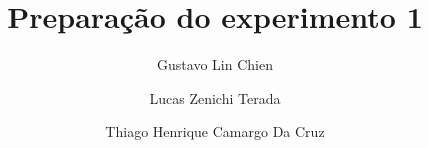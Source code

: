\documentclass[report]{zentera}
\title{Preparação do experimento 1}
\author{Gustavo Lin Chien \RA{174165} \and Lucas Zenichi Terada \RA{182775} \and Thiago Henrique Camargo Da Cruz \RA{187576}}
\begin{document}
\makeheader
\end{document}
